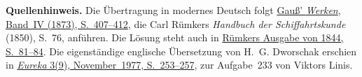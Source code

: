 \par\medskip\begin{small}\noindent\textbf{Quellenhinweis.} Die Übertragung in modernes Deutsch folgt \href{https://gdz.sub.uni-goettingen.de/id/PPN236005081}{Gauß’ \textit{Werken}, Band~IV (1873), S.~407--412}, die Carl Rümkers \textit{Handbuch der Schiffahrtskunde} (1850), S.~76, anführen. Die Lösung steht auch in \href{https://www.e-rara.ch/download/pdf/14097000.pdf}{Rümkers Ausgabe von 1844, S.~81--84}. Die eigenständige englische Übersetzung von H.~G. Dworschak erschien in \href{https://cms.math.ca/wp-content/uploads/crux-pdfs/Crux_v3n09_Nov.pdf#page=14}{\textit{Eureka} 3(9), November~1977, S.~253--257}, zur Aufgabe~233 von Viktors Linis.\par\end{small}
